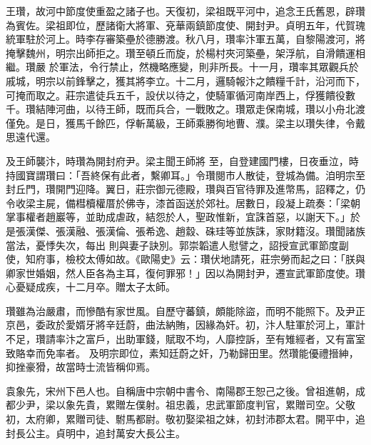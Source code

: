 \begin{pinyinscope}
 王瓚，故河中節度使重盈之諸子也。天復初，梁祖既平河中，追念王氏舊恩，辟瓚為賓佐。梁祖即位，歷諸衛大將軍、兗華兩鎮節度使、開封尹。貞明五年，代賀瑰統軍駐於河上。時李存審築壘於德勝渡。秋八月，瓚率汴軍五萬，自黎陽渡河，將掩擊魏州，明宗出師拒之。瓚至頓丘而旋，於楊村夾河築壘，架浮航，自滑饋運相繼。瓚嚴
 於軍法，令行禁止，然機略應變，則非所長。十一月，瓚率其眾觀兵於戚城，明宗以前鋒擊之，獲其將李立。十二月，邏騎報汴之饋糧千計，沿河而下，可掩而取之。莊宗遣徒兵五千，設伏以待之，使騎軍循河南岸西上，俘獲饋役數千。瓚結陣河曲，以待王師，既而兵合，一戰敗之。瓚眾走保南城，瓚以小舟北渡僅免。是日，獲馬千餘匹，俘斬萬級，王師乘勝徇地曹、濮。梁主以瓚失律，令戴思遠代還。



 及王師襲汴，時瓚為開封府尹。梁主聞王師將
 至，自登建國門樓，日夜垂泣，時持國寶謂瓚曰：「吾終保有此者，繫卿耳。」令瓚閱市人散徒，登城為備。洎明宗至封丘門，瓚開門迎降。翼日，莊宗御元德殿，瓚與百官待罪及進幣馬，詔釋之，仍令收梁主屍，備槥櫝權厝於佛寺，漆首函送於郊社。居數日，段凝上疏奏：「梁朝掌事權者趙巖等，並助成虐政，結怨於人，聖政惟新，宜誅首惡，以謝天下。」於是張漢傑、張漢融、張漢倫、張希逸、趙縠、硃珪等並族誅，家財籍沒。瓚聞諸族當法，憂悸失次，每出
 則與妻子訣別。郭崇韜遣人慰譬之，詔授宣武軍節度副使，知府事，檢校太傅如故。《歐陽史》云：瓚伏地請死，莊宗勞而起之曰：「朕與卿家世婚姻，然人臣各為主耳，復何罪邪！」因以為開封尹，遷宣武軍節度使。瓚心憂疑成疾，十二月卒。贈太子太師。



 瓚雖為治嚴肅，而慘酷有家世風。自歷守蕃鎮，頗能除盜，而明不能照下。及尹正京邑，委政於愛婿牙將辛廷蔚，曲法納賄，因緣為奸。初，汴人駐軍於河上，軍計不足，瓚請率汴之富戶，出助軍錢，賦取不均，人靡控訴，至有雉經者，又有富室致賂幸而免率者。
 及明宗即位，素知廷蔚之奸，乃勒歸田里。然瓚能優禮搢紳，抑挫豪猾，故當時士流皆稱仰焉。



 袁象先，宋州下邑人也。自稱唐中宗朝中書令、南陽郡王恕己之後。曾祖進朝，成都少尹，梁以象先貴，累贈左僕射。祖忠義，忠武軍節度判官，累贈司空。父敬初，太府卿，累贈司徒、駙馬都尉。敬初娶梁祖之妹，初封沛郡太君。開平中，追封長公主。貞明中，追封萬安大長公主。




\end{pinyinscope}
